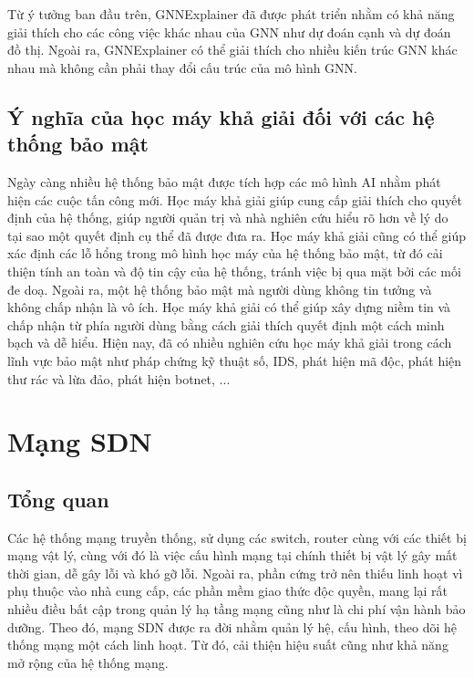 \bigbreak\noindent
Từ ý tưởng ban đầu trên, GNNExplainer đã được phát triển nhằm có khả năng giải thích cho các công việc khác nhau của GNN như dự đoán cạnh và dự đoán đồ thị. Ngoài ra, GNNExplainer có thể giải thích cho nhiều kiến trúc GNN khác nhau mà không cần phải thay đổi cấu trúc của mô hình GNN.

\subsection{Ý nghĩa của học máy khả giải đối với các hệ thống bảo mật}

Ngày càng nhiều hệ thống bảo mật được tích hợp các mô hình AI nhằm phát hiện các cuộc tấn công mới. Học máy khả giải giúp cung cấp giải thích cho quyết định của hệ thống, giúp người quản trị và nhà nghiên cứu hiểu rõ hơn về lý do tại sao một quyết định cụ thể đã được đưa ra. Học máy khả giải cũng có thể giúp xác định các lỗ hổng trong mô hình học máy của hệ thống bảo mật, từ đó cải thiện tính an toàn và độ tin cậy của hệ thống, tránh việc bị qua mặt bởi các mối đe doạ. Ngoài ra, một hệ thống bảo mật mà người dùng không tin tưởng và không chấp nhận là vô ích. Học máy khả giải có thể giúp xây dựng niềm tin và chấp nhận từ phía người dùng bằng cách giải thích quyết định một cách minh bạch và dễ hiểu. Hiện nay, đã có nhiều nghiên cứu học máy khả giải trong cách lĩnh vực bảo mật như pháp chứng kỹ thuật số, IDS, phát hiện mã độc, phát hiện thư rác và lừa đảo, phát hiện botnet, ... 

\section{Mạng SDN}

\subsection{Tổng quan}

Các hệ thống mạng truyền thống, sử dụng các switch, router cùng với các thiết bị mạng vật lý, cùng với đó là việc cấu hình mạng tại chính thiết bị vật lý gây mất thời gian, dễ gây lỗi và khó gỡ lỗi. Ngoài ra, phần cứng trở nên thiếu linh hoạt vì phụ thuộc vào nhà cung cấp, các phần mềm giao thức độc quyền, mang lại rất nhiều điều bất cập trong quản lý hạ tầng mạng cũng như là chi phí vận hành bảo dưỡng. Theo đó, mạng SDN được ra đời nhằm quản lý hệ, cấu hình, theo dõi hệ thống mạng một cách linh hoạt. Từ đó, cải thiện hiệu suất cũng như khả năng mở rộng của hệ thống mạng.

